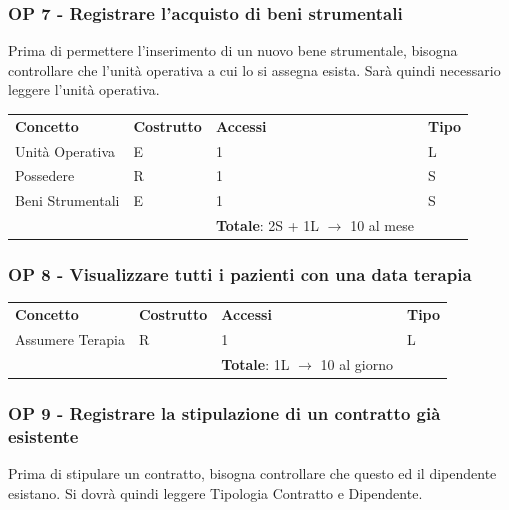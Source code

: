 \documentclass[a4paper, 12pt]{report}
\begin{document}
\subsubsection*{OP 7 - Registrare l'acquisto di beni strumentali}
Prima di permettere l'inserimento di un nuovo bene strumentale, bisogna controllare che l'unità operativa a
cui lo si assegna esista. Sarà quindi necessario leggere l'unità operativa. \par
\bigskip
\noindent
\begin{tabularx}{\textwidth}{XlXl}
        \rowcolor{seaGreen}
        \textbf{Concetto} & \textbf{Costrutto} & \textbf{Accessi} & \textbf{Tipo} \\
        Unità Operativa & E & 1 & L \\
        \hline
        Possedere & R & 1 & S \\
        \hline
        Beni Strumentali & E & 1 & S \\
        \rowcolor{seaGreen}
         &  & \textbf{Totale}: 2S + 1L $\rightarrow$ 10 al mese & \\
\end{tabularx}

\subsubsection*{OP 8 - Visualizzare tutti i pazienti con una data terapia}
\begin{tabularx}{\textwidth}{XlXl}
        \rowcolor{seaGreen}
        \textbf{Concetto} & \textbf{Costrutto} & \textbf{Accessi} & \textbf{Tipo} \\
        Assumere Terapia & R & 1 & L \\
        \rowcolor{seaGreen}
         &  & \textbf{Totale}: 1L $\rightarrow$ 10 al giorno & \\
\end{tabularx}

\subsubsection*{OP 9 - Registrare la stipulazione di un contratto già esistente}
Prima di stipulare un contratto, bisogna controllare che questo ed il dipendente esistano. 
Si dovrà quindi leggere Tipologia Contratto e Dipendente. \par
\end{document}
